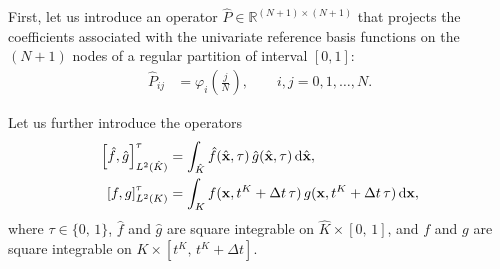 \documentclass{scrreprt}
\theoremstyle{definition}
\theoremstyle{nonumberplain}
\renewcommand{\vec}[1]{{\textbf{#1}}}
\newcommand{\cell}{K}
\newcommand{\dV}{\text{d}\vec{x}}
\newcommand{\refVec}[1]{\hat{\vec{#1}}}
\newcommand{\refCell}{\hat{\cell}}
\newcommand{\refdV}{\textup{d}\hat{\vec{x}}}
\begin{document}
First, let us introduce an operator $\hat{P}\in\mathbb{R}^{(N+1)\times(N+1)}$
that projects the coefficients associated
with the univariate reference basis functions on 
the $(N+1)$ nodes of a regular partition of interval $[0,1]$:
\begin{align}
\label{eq:ader_impl:operators:regular_mesh_projector_1d}
\hat{P}_{ij} &= \varphi_i \left({\frac{j}{N}}\right),\qquad 
i,j=0,1,\ldots,N.
\end{align}

Let us further introduce the operators
\begin{align}
\left[\hat{f},\hat{g}\right]^{\tau}_{L^2(\refCell)}
&=
\int_{\refCell}
\hat{f}(\refVec{x},\tau)\,\hat{g}(\refVec{x},\tau)\,\refdV,
\\
\left[f,g\right]^{\tau}_{L^2(\cell)}
&=
\int_{\cell}
f(\vec{x},t^K+\Delta t\,\tau)\,g(\vec{x},t^K+\Delta t\,\tau)\,\dV,
\end{align}
where $\tau\in\{0,\,1\}$, $\hat{f}$ and $\hat{g}$ are square integrable on
$\refCell\times[0,\,1]$, and
$f$ and $g$ are square integrable on
$\cell\times[t^\cell,\,t^\cell+\Delta t]$.
\end{document}

